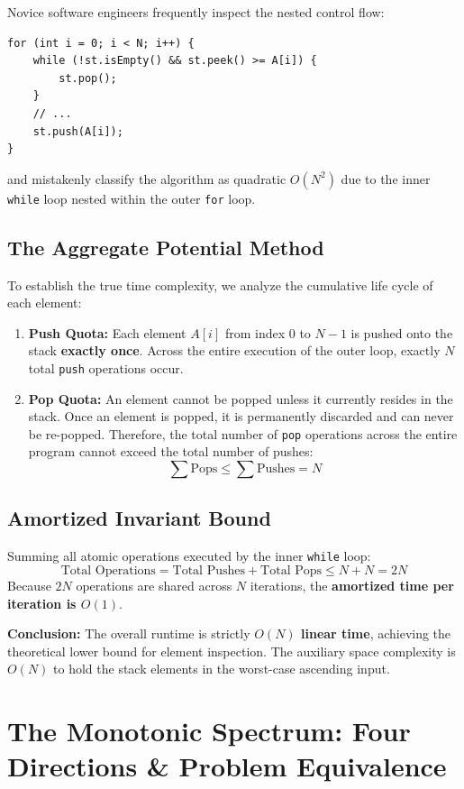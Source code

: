 \documentclass[10pt,journal,compsoc,onecolumn]{IEEEtran}
\begin{document}
Novice software engineers frequently inspect the nested control flow:
\begin{verbatim}
for (int i = 0; i < N; i++) {
    while (!st.isEmpty() && st.peek() >= A[i]) {
        st.pop();
    }
    // ...
    st.push(A[i]);
}
\end{verbatim}
and mistakenly classify the algorithm as quadratic $O(N^2)$ due to the inner \texttt{while} loop nested within the outer \texttt{for} loop.

\subsection{The Aggregate Potential Method}

To establish the true time complexity, we analyze the cumulative life cycle of each element:
\begin{enumerate}
    \item \textbf{Push Quota:} Each element $A[i]$ from index $0$ to $N - 1$ is pushed onto the stack \textbf{exactly once}. Across the entire execution of the outer loop, exactly $N$ total \texttt{push} operations occur.
    \item \textbf{Pop Quota:} An element cannot be popped unless it currently resides in the stack. Once an element is popped, it is permanently discarded and can never be re-popped. Therefore, the total number of \texttt{pop} operations across the entire program cannot exceed the total number of pushes:
    \[
    \sum \text{Pops} \le \sum \text{Pushes} = N
    \]
\end{enumerate}

\subsection{Amortized Invariant Bound}

Summing all atomic operations executed by the inner \texttt{while} loop:
\[
\text{Total Operations} = \text{Total Pushes} + \text{Total Pops} \le N + N = 2N
\]
Because $2N$ operations are shared across $N$ iterations, the \textbf{amortized time per iteration is $O(1)$}. 

\textbf{Conclusion:} The overall runtime is strictly \textbf{$O(N)$ linear time}, achieving the theoretical lower bound for element inspection. The auxiliary space complexity is $O(N)$ to hold the stack elements in the worst-case ascending input.

\section{The Monotonic Spectrum: Four Directions \& Problem Equivalence}
\label{sec:spectrum}
\end{document}
